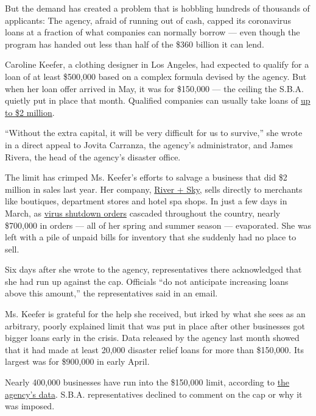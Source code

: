 But the demand has created a problem that is hobbling hundreds of
thousands of applicants: The agency, afraid of running out of cash,
capped its coronavirus loans at a fraction of what companies can
normally borrow --- even though the program has handed out less than
half of the \$360 billion it can lend.

Caroline Keefer, a clothing designer in Los Angeles, had expected to
qualify for a loan of at least \$500,000 based on a complex formula
devised by the agency. But when her loan offer arrived in May, it was
for \$150,000 --- the ceiling the S.B.A. quietly put in place that
month. Qualified companies can usually take loans of
\href{https://www.sba.gov/about-sba/sba-newsroom/press-releases-media-advisories/sba-provide-disaster-assistance-loans-small-businesses-impacted-coronavirus-covid-19}{up
to \$2 million}.

``Without the extra capital, it will be very difficult for us to
survive,'' she wrote in a direct appeal to Jovita Carranza, the agency's
administrator, and James Rivera, the head of the agency's disaster
office.

The limit has crimped Ms. Keefer's efforts to salvage a business that
did \$2 million in sales last year. Her company,
\href{https://www.riverandskycalifornia.com/}{River + Sky}, sells
directly to merchants like boutiques, department stores and hotel spa
shops. In just a few days in March, as
\href{https://www.nytimes3xbfgragh.onion/interactive/2020/us/states-reopen-map-coronavirus.html}{virus
shutdown orders} cascaded throughout the country, nearly \$700,000 in
orders --- all of her spring and summer season --- evaporated. She was
left with a pile of unpaid bills for inventory that she suddenly had no
place to sell.

Six days after she wrote to the agency, representatives there
acknowledged that she had run up against the cap. Officials ``do not
anticipate increasing loans above this amount,'' the representatives
said in an email.

Ms. Keefer is grateful for the help she received, but irked by what she
sees as an arbitrary, poorly explained limit that was put in place after
other businesses got bigger loans early in the crisis. Data released by
the agency last month showed that it had made at least 20,000 disaster
relief loans for more than \$150,000. Its largest was for \$900,000 in
early April.

Nearly 400,000 businesses have run into the \$150,000 limit, according
to
\href{https://www.sba.gov/funding-programs/loans/coronavirus-relief-options/economic-injury-disaster-loans\#section-header-5}{the
agency's data}. S.B.A. representatives declined to comment on the cap or
why it was imposed.

